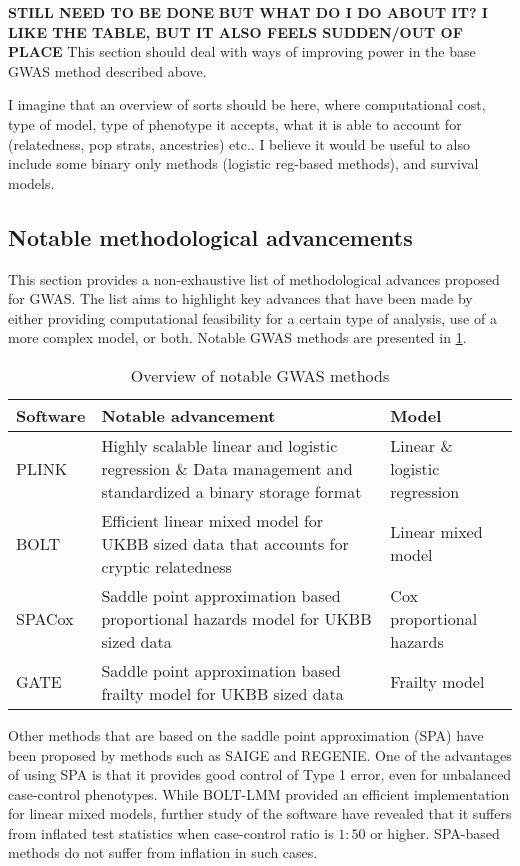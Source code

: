 \textbf{STILL NEED TO BE DONE} \textbf{BUT WHAT DO I DO ABOUT IT? I LIKE THE TABLE, BUT IT ALSO FEELS SUDDEN/OUT OF PLACE}
This section should deal with ways of improving power in the base GWAS method described above.

I imagine that an overview of sorts should be here, where computational cost, type of model, type of phenotype it accepts, what it is able to account for (relatedness, pop strats, ancestries) etc.. I believe it would be useful to also include some binary only methods (logistic reg-based methods), and survival models.




\subsection{Notable methodological advancements}
This section provides a non-exhaustive list of methodological advances proposed for GWAS. The list aims to highlight key advances that have been made by either providing computational feasibility for a certain type of analysis, use of a more complex model, or both. Notable GWAS methods are presented in \cref{table:GWASoverview}. 

\begin{table}[h]
\centering
\begin{tabularx}{\textwidth}{l X l}
\hline
Software	&	Notable advancement		&	Model \\
\hline
PLINK\cite{chang2015second,purcell2007plink}	&
Highly scalable linear and logistic regression \& Data management and standardized a binary storage format	&
Linear \& logistic regression	\\
BOLT\cite{loh2015efficient}	&
Efficient linear mixed model for UKBB sized data that accounts for cryptic relatedness	&
Linear mixed model	\\
SPACox\cite{bi2020fast}	&	
Saddle point approximation based proportional hazards model for UKBB sized data &
Cox proportional hazards \\
GATE\cite{dey2022efficient}	&
Saddle point approximation based frailty model for UKBB sized data	&
Frailty model \\
\hline
\end{tabularx}
\caption{Overview of notable GWAS methods}
\label{table:GWASoverview}
\end{table}
Other methods that are based on the saddle point approximation (SPA)\cite{daniels1954saddlepoint,kuonen1999miscellanea} have been proposed by methods such as SAIGE\cite{zhou2018efficiently} and REGENIE\cite{mbatchou2021computationally}. One of the advantages of using SPA is that it provides good control of Type 1 error, even for unbalanced case-control phenotypes. While BOLT-LMM provided an efficient implementation for linear mixed models, further study of the software have revealed that it suffers from inflated test statistics when case-control ratio is $ 1:50 $ or higher. SPA-based methods do not suffer from inflation in such cases\cite{mbatchou2021computationally}.



